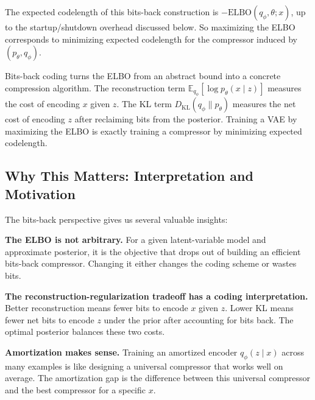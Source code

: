 The expected codelength of this bits-back construction is $-\text{ELBO}(q_\phi,\theta;x)$, up to the startup/shutdown overhead discussed below. So maximizing the ELBO corresponds to minimizing expected codelength for the compressor induced by $(p_\theta, q_\phi)$.

\vspace{1.5em}

\begin{keyinsight}
Bits-back coding turns the ELBO from an abstract bound into a concrete compression algorithm. The reconstruction term $\mathbb{E}_{q_\phi}[\log p_\theta(x \mid z)]$ measures the cost of encoding $x$ given $z$. The KL term $D_{\text{KL}}(q_\phi \| p_\theta)$ measures the net cost of encoding $z$ after reclaiming bits from the posterior. Training a VAE by maximizing the ELBO is exactly training a compressor by minimizing expected codelength.
\end{keyinsight}

\vspace{1.5em}

\subsection{Why This Matters: Interpretation and Motivation}

The bits-back perspective gives us several valuable insights:

\vspace{0.3cm}

\textbf{The ELBO is not arbitrary.} For a given latent-variable model and approximate posterior, it is the objective that drops out of building an efficient bits-back compressor. Changing it either changes the coding scheme or wastes bits.

\vspace{0.3cm}

\textbf{The reconstruction-regularization tradeoff has a coding interpretation.} Better reconstruction means fewer bits to encode $x$ given $z$. Lower KL means fewer net bits to encode $z$ under the prior after accounting for bits back. The optimal posterior balances these two costs.

\vspace{0.3cm}

\textbf{Amortization makes sense.} Training an amortized encoder $q_\phi(z \mid x)$ across many examples is like designing a universal compressor that works well on average. The amortization gap is the difference between this universal compressor and the best compressor for a specific $x$.

